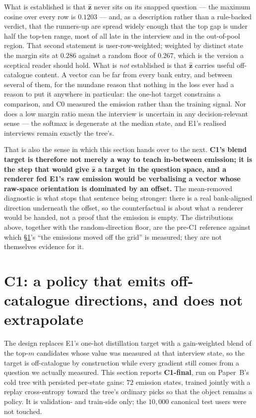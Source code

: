 \documentclass[11pt]{article}
\newcommand{\zz}{\mathbf{z}}
\newcommand{\zhat}{\hat{\zz}}
\begin{document}
What is established is that $\zhat$ never sits on its snapped question --- the maximum cosine over
every row is $0.1203$ --- and, as a description rather than a rule-backed verdict, that the runners-up
are spread widely enough that the top gap is under half the top-ten range, most of all late in the
interview and in the out-of-pool region. That second statement is user-row-weighted; weighted by
distinct state the margin sits at $0.286$ against a random floor of $0.267$, which is the version a
sceptical reader should hold. What is \emph{not} established is that $\zhat$ carries useful
off-catalogue content. A vector can be far from every bank entry, and between several of them, for
the mundane reason that nothing in the loss ever had a reason to put it anywhere in particular: the
one-hot target constrains a comparison, and C0 measured the emission rather than the training signal.
Nor does a low margin ratio mean the interview is uncertain in any decision-relevant sense --- the
softmax is degenerate at the median state, and E1's realised interviews remain exactly the tree's.

That is also the sense in which this section hands over to the next. \textbf{C1's blend target is
therefore not merely a way to teach in-between emission; it is the step that would give $\zhat$ a
target in the question space, and a renderer fed E1's raw emission would be verbalising a vector
whose raw-space orientation is dominated by an offset.} The mean-removed diagnostic is what stops
that sentence being stronger: there is a real bank-aligned direction underneath the offset, so the
counterfactual is about what a renderer would be handed, not a proof that the emission is empty. The
distributions above, together with the random-direction floor, are the pre-C1 reference against which
\S\ref{sec:c1}'s ``the emissions moved off the grid'' is measured; they are not themselves evidence
for it.

\section{C1: a policy that emits off-catalogue directions, and does not extrapolate}
\label{sec:c1}

The design replaces E1's one-hot distillation target with a gain-weighted blend of the top-$m$
candidates whose value was measured at that interview state, so the target is off-catalogue by
construction while every gradient still comes from a question we actually measured. This section
reports \textbf{C1-final}, run on Paper~B's cold tree with persisted per-state gains: $72$ emission
states, trained jointly with a replay cross-entropy toward the tree's ordinary picks so that the
object remains a policy. It is validation- and train-side only; the $10{,}000$ canonical test users
were not touched.
\end{document}
